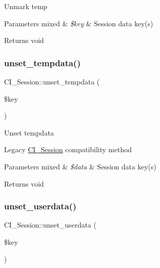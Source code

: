 Unmark temp


\begin{DoxyParams}[1]{Parameters}
mixed & {\em \$key} & Session data key(s) \\
\hline
\end{DoxyParams}
\begin{DoxyReturn}{Returns}
void 
\end{DoxyReturn}
\mbox{\label{class_c_i___session_a3d68c0075dd3d1ca3f1368ba331d9436}} 
\subsubsection{\texorpdfstring{unset\+\_\+tempdata()}{unset\_tempdata()}}
{\footnotesize\ttfamily C\+I\+\_\+\+Session\+::unset\+\_\+tempdata (\begin{DoxyParamCaption}\item[{}]{\$key }\end{DoxyParamCaption})}

Unset tempdata

Legacy \mbox{\hyperlink{class_c_i___session}{C\+I\+\_\+\+Session}} compatibility method


\begin{DoxyParams}[1]{Parameters}
mixed & {\em \$data} & Session data key(s) \\
\hline
\end{DoxyParams}
\begin{DoxyReturn}{Returns}
void 
\end{DoxyReturn}
\mbox{\label{class_c_i___session_a3a6fb33026cbe0467b6158978e198ab6}} 
\subsubsection{\texorpdfstring{unset\+\_\+userdata()}{unset\_userdata()}}
{\footnotesize\ttfamily C\+I\+\_\+\+Session\+::unset\+\_\+userdata (\begin{DoxyParamCaption}\item[{}]{\$key }\end{DoxyParamCaption})}

